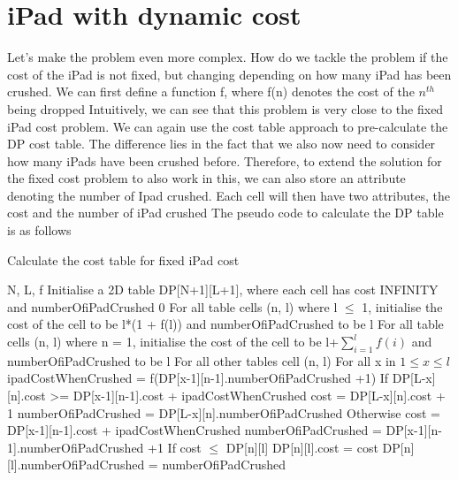 \documentclass[12pt,a4paper,oneside]{report}
\newcommand{\INDSTATE}[1][1]{\STATE\hspace{#1\algorithmicindent}}
\begin{document}
\section{iPad with dynamic cost}
Let's make the problem even more complex. How do we tackle the problem if the cost of the iPad is not fixed, but changing depending on how many iPad has been crushed. 
We can first define a function f, where f(n) denotes the cost of the $n^{th}$ being dropped
Intuitively, we can see that this problem is very close to the fixed iPad cost problem. We can again use the cost table approach to pre-calculate the DP cost table. The difference lies in the fact that we also now need to consider how many iPads have been crushed before.
Therefore, to extend the solution for the fixed cost problem to also work in this, we can also store an attribute denoting the number of Ipad crushed. Each cell will then have two attributes, the cost and the number of iPad crushed
The pseudo code to calculate the DP table is as follows
\begin{algorithm}
        \caption{Calculate the cost table for fixed iPad cost}
        \begin{algorithmic}[1]
            \REQUIRE N, L, f
            \STATE Initialise a 2D table DP[N+1][L+1], where each cell has cost INFINITY and numberOfiPadCrushed  0
            \STATE For all table cells (n, l) where l $\leq$ 1, initialise the cost of the cell to be l*(1 + f(l)) and numberOfiPadCrushed  to be l
            \STATE For all table cells (n, l) where n = 1, initialise the cost of the cell to be l+$\sum\limits_{i=1}^l f(i)$ and numberOfiPadCrushed to be l
            \STATE For all other tables cell (n, l) 
            \INDSTATE For all x in $1 \leq x \leq l$
            \INDSTATE[2] ipadCostWhenCrushed = f(DP[x-1][n-1].numberOfiPadCrushed +1)
            \INDSTATE[2] If DP[L-x][n].cost >= DP[x-1][n-1].cost + ipadCostWhenCrushed
            \INDSTATE[3] cost = DP[L-x][n].cost + 1
            \INDSTATE[3] numberOfiPadCrushed = DP[L-x][n].numberOfiPadCrushed
            \INDSTATE[2] Otherwise
            \INDSTATE[3] cost = DP[x-1][n-1].cost + ipadCostWhenCrushed
            \INDSTATE[3] numberOfiPadCrushed = DP[x-1][n-1].numberOfiPadCrushed +1
            \INDSTATE[2] If cost $\leq$ DP[n][l]
            \INDSTATE[3] DP[n][l].cost = cost
            \INDSTATE[3] DP[n][l].numberOfiPadCrushed = numberOfiPadCrushed 

        \end{algorithmic}
\end{algorithm}
\end{document}
